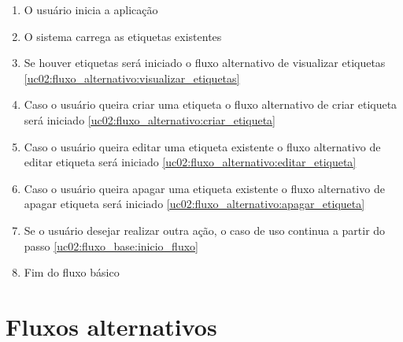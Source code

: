 \documentclass[
	12pt,				%
	oneside,			%
	a4paper,			%
	english,			%
	brazil,				%
	]{abntex2}
\begin{document}
\begin{enumerate}
    \item O usuário inicia a aplicação
    \item O sistema carrega as etiquetas existentes \label{uc02:fluxo_base:inicio_fluxo}
    \item Se houver etiquetas será iniciado o fluxo alternativo de visualizar etiquetas \ref{uc02:fluxo_alternativo:visualizar_etiquetas}
    \item Caso o usuário queira criar uma etiqueta o fluxo alternativo de criar etiqueta será iniciado \ref{uc02:fluxo_alternativo:criar_etiqueta} \label{uc02:fluxo_base:inicio_opcoes}
     
    \item Caso o usuário queira editar uma etiqueta existente o fluxo alternativo de editar etiqueta será iniciado \ref{uc02:fluxo_alternativo:editar_etiqueta}
   
    \item Caso o usuário queira apagar uma etiqueta existente o fluxo alternativo de apagar etiqueta será iniciado \ref{uc02:fluxo_alternativo:apagar_etiqueta}
    \item Se o usuário desejar realizar outra ação, o caso de uso continua a partir do passo \ref{uc02:fluxo_base:inicio_fluxo}
    \item Fim do fluxo básico
\end{enumerate}

\section{Fluxos alternativos}
\end{document}
